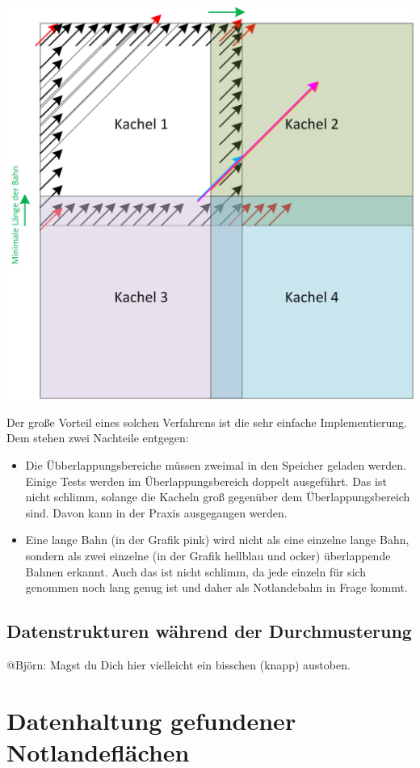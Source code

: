 \documentclass[
11pt, %
a4paper, %
oneside, %
pdfspacing, %
headinclude,
BCOR5mm, %
ngerman, %
bibtotocnumbered,
]{scrartcl}
\begin{document}
\includegraphics[width=\textwidth]{./drawings/UeberlappungKacheln.png}

Der große Vorteil eines solchen Verfahrens ist die sehr einfache Implementierung. Dem stehen zwei Nachteile entgegen:
\begin{itemize}
	\item Die Übberlappungsbereiche müssen zweimal in den Speicher geladen werden. Einige Tests werden im Überlappungsbereich doppelt ausgeführt. Das ist nicht schlimm, solange die Kacheln groß gegenüber dem Überlappungsbereich sind. Davon kann in der Praxis ausgegangen werden.
	\item Eine lange Bahn (in der Grafik pink) wird nicht als eine einzelne lange Bahn, sondern als zwei einzelne (in der Grafik hellblau und ocker) überlappende Bahnen erkannt. Auch das ist nicht schlimm, da jede einzeln für sich genommen noch lang genug ist und daher als Notlandebahn in Frage kommt.
\end{itemize}


\subsection{Datenstrukturen während der Durchmusterung}

@Björn: Magst du Dich hier vielleicht ein bisschen (knapp) austoben.

\section{Datenhaltung gefundener Notlandeflächen}
\end{document}
